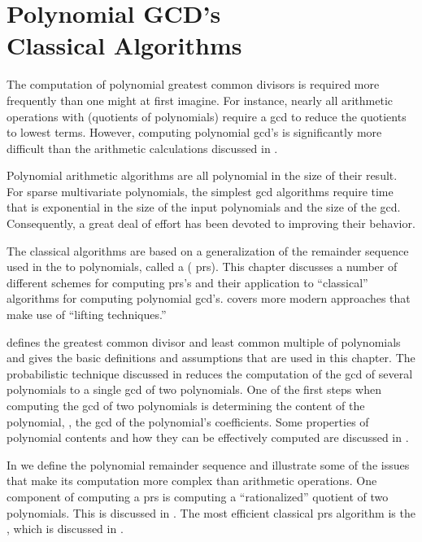 \chapter[Polynomial GCD's: Classical Algorithms]{Polynomial GCD's\\Classical Algorithms}
\label{PRS:Chap}


The computation of polynomial greatest common divisors is required
more frequently than one might at first imagine.  For instance, nearly
all arithmetic operations with  (quotients of
polynomials) require a {\sc gcd} to reduce the quotients to lowest
terms.  However, computing polynomial {\sc gcd}'s is significantly
more difficult than the arithmetic calculations discussed in
.

Polynomial arithmetic algorithms are all polynomial in the size of
their result.  For sparse multivariate polynomials, the simplest {\sc
gcd} algorithms require time that is exponential in the size of the
input polynomials and the size of the {\sc gcd}.  Consequently, a
great deal of effort has been devoted to improving their behavior.

The classical algorithms are based on a generalization of the
remainder sequence used in the  to
polynomials, called a  ({\sc
prs}).  This chapter discusses a number of different schemes for
computing {\sc prs}'s and their application to ``classical''
algorithms for computing polynomial {\sc gcd}'s.
 covers more modern approaches that make
use of ``lifting techniques.''

 defines the greatest common divisor and least
common multiple of polynomials and gives the basic definitions and
assumptions that are used in this chapter.  The probabilistic
technique discussed in  reduces the
computation of the {\sc gcd} of several polynomials to a single {\sc
gcd} of two polynomials.  One of the first steps when computing the
{\sc gcd} of two polynomials is determining the
content of the polynomial, \ie, the
{\sc gcd} of the polynomial's coefficients.  Some properties of
polynomial contents and how they can be effectively computed are
discussed in .

In  we define the polynomial remainder
sequence and illustrate some of the issues that make its computation
more complex than arithmetic operations.  One component of computing a
{\sc prs} is computing a ``rationalized'' quotient of two polynomials.
This is discussed in .  The most efficient
classical {\sc prs} algorithm is the , which is discussed in .


